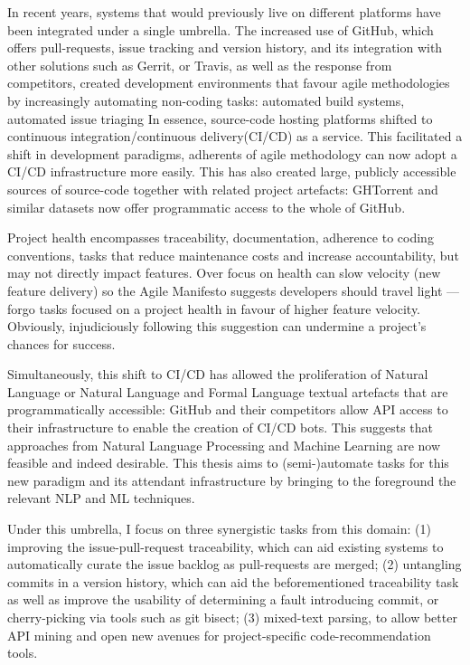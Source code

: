 In recent years, systems that would previously live on different platforms have
been integrated under a single umbrella. The increased use of GitHub, which
offers pull-requests, issue tracking and version history, and its integration
with other solutions such as Gerrit, or Travis, as well as the response from
competitors, created development environments that favour agile methodologies by
increasingly automating non-coding tasks: automated build systems, automated
issue triaging \etc In essence, source-code hosting platforms shifted to
continuous integration/continuous delivery(CI/CD) as a service. This facilitated
a shift in development paradigms, adherents of agile methodology can now adopt a
CI/CD infrastructure more easily. This has also created large, publicly
accessible sources of source-code together with related project artefacts:
GHTorrent and similar datasets now offer programmatic access to the whole of
GitHub.

Project health encompasses traceability, documentation, adherence to coding
conventions, tasks that reduce maintenance costs and increase accountability,
but may not directly impact features.  Over focus on health can slow velocity
(new feature delivery) so the Agile Manifesto suggests developers should travel
light --- forgo tasks focused on a project health in favour of higher feature
velocity. Obviously, injudiciously following this suggestion can undermine a
project's chances for success.

Simultaneously, this shift to CI/CD has allowed the proliferation of Natural
Language or Natural Language and Formal Language textual artefacts that are
programmatically accessible: GitHub and their competitors allow API access to
their infrastructure to enable the creation of CI/CD bots. This suggests that
approaches from Natural Language Processing and Machine Learning are now
feasible and indeed desirable. This thesis aims to (semi-)automate tasks for
this new paradigm and its attendant infrastructure by bringing to the foreground
the relevant NLP and ML techniques.

Under this umbrella, I focus on three synergistic tasks from this domain: (1)
improving the issue-pull-request traceability, which can aid existing systems to
automatically curate the issue backlog as pull-requests are merged; (2)
untangling commits in a version history, which can aid the beforementioned
traceability task as well as improve the usability of determining a fault
introducing commit, or cherry-picking via tools such as git bisect; (3)
mixed-text parsing, to allow better API mining and open new avenues for
project-specific code-recommendation tools.